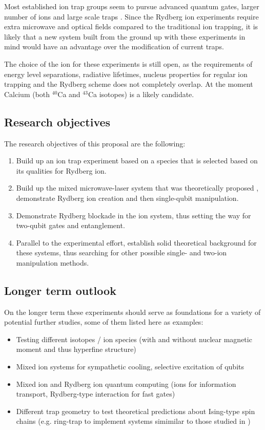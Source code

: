 Most established ion trap groups seem to pursue advanced quantum gates, larger number of ions and large scale traps \cite{Kielpinski2002}. Since the Rydberg ion experiments require extra microwave and optical fields compared to the traditional ion trapping, it is likely that a new system built from the ground up with these experiments in mind would have an advantage over the modification of current traps.

The choice of the ion for these experiments is still open, as the requirements of energy level separations, radiative lifetimes, nucleus properties for regular ion trapping and the Rydberg scheme does not completely overlap. At the moment Calcium (both $^{40}$Ca and $^{43}$Ca isotopes) is a likely candidate.

\subsection{Research objectives}
The research objectives of this proposal are the following:
\begin{enumerate}
 \item Build up an ion trap experiment based on a species that is selected based on its qualities for Rydberg ion.
 \item Build up the mixed microwave-laser system that was theoretically proposed \cite{Mueller2008}, demonstrate Rydberg ion creation and then single-qubit manipulation.
 \item Demonstrate Rydberg blockade in the ion system, thus setting the way for two-qubit gates and entanglement.
 \item Parallel to the experimental effort, establish solid theoretical background for these systems, thus searching for other possible single- and two-ion manipulation methods.
\end{enumerate}

\subsection{Longer term outlook}
On the longer term these experiments should serve as foundations for a variety of potential further studies, some of them listed here as examples:
\begin{itemize}
 \item Testing different isotopes / ion species (with and without nuclear magnetic moment and thus hyperfine structure)
 \item Mixed ion systems for sympathetic cooling, selective excitation of qubits
 \item Mixed ion and Rydberg ion quantum computing (ions for information transport, Rydberg-type interaction for fast gates)
 \item Different trap geometry to test theoretical predictions about Ising-type spin chains (e.g. ring-trap \cite{Champenois2010} to implement systems simimilar to those studied in \cite{Olmos2009})
\end{itemize}
